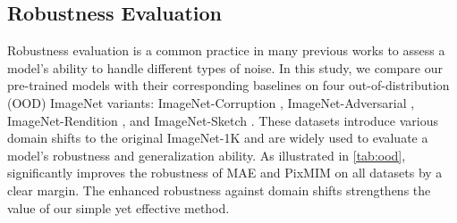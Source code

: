 \subsection{Robustness Evaluation}
\label{sec:robust_eval}
Robustness evaluation is a common practice in many previous works \cite{zhou2021ibot,MILAN,MAE} to assess a model's ability to handle different types of noise. In this study, we compare our pre-trained models with their corresponding baselines on four out-of-distribution (OOD) ImageNet variants: ImageNet-Corruption \cite{ImageNetC}, ImageNet-Adversarial \cite{ImageNetA}, ImageNet-Rendition \cite{ImageNetR}, and ImageNet-Sketch \cite{ImageNetS}. These datasets introduce various domain shifts to the original ImageNet-1K and are widely used to evaluate a model's robustness and generalization ability. As illustrated in \autoref{tab:ood}, \ourmethod significantly improves the robustness of MAE and PixMIM on all datasets by a clear margin. The enhanced robustness against domain shifts strengthens the value of our simple yet effective method.



